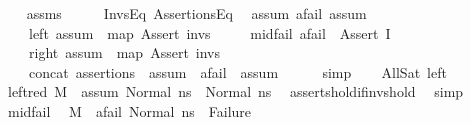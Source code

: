 \begin{isabellebody}
%
\isadelimproof
\ \ %
\endisadelimproof
%
\isatagproof
{}\isamarkupfalse%
\ assms\isanewline
{}\isamarkupfalse%
\ {\isacharminus}{\kern0pt}\isanewline
\ \ \isamarkupfalse%
\ InvsEq\ AssertionsEq\ \isamarkupfalse%
\ assum{}\ a{\isacharunderscore}{\kern0pt}fail\ assum{}\ \isanewline
\ \ \ \ left{\isacharcolon}{\kern0pt}\ {\isachardoublequoteopen}assum{}\ {\isacharequal}{\kern0pt}\ map\ Assert\ invs{}{\isachardoublequoteclose}\ \isanewline
\ \ \ \ mid{\isacharunderscore}{\kern0pt}fail{\isacharcolon}{\kern0pt}\ {\isachardoublequoteopen}a{\isacharunderscore}{\kern0pt}fail\ {\isacharequal}{\kern0pt}\ Assert\ I{\isachardoublequoteclose}\ \isanewline
\ \ \ \ right{\isacharcolon}{\kern0pt}\ {\isachardoublequoteopen}assum{}\ {\isacharequal}{\kern0pt}\ map\ Assert\ invs{}{\isachardoublequoteclose}\ \isanewline
\ \ \ \ concat{\isacharcolon}{\kern0pt}\ {\isachardoublequoteopen}assertions\ {\isacharequal}{\kern0pt}\ assum{}\ {\isacharat}{\kern0pt}\ {\isacharbrackleft}{\kern0pt}a{\isacharunderscore}{\kern0pt}fail{\isacharbrackright}{\kern0pt}\ {\isacharat}{\kern0pt}\ assum{}{\isachardoublequoteclose}\isanewline
\ \ \ \ \isamarkupfalse%
\ simp\isanewline
\ \ \isamarkupfalse%
\ AllSat\ left\ \isamarkupfalse%
\ left{\isacharunderscore}{\kern0pt}red{\isacharcolon}{\kern0pt}\ {\isachardoublequoteopen}M{\isacharcomma}{\kern0pt}{\isasymLambda}{\isacharcomma}{\kern0pt}{\isasymGamma}{\isacharcomma}{\kern0pt}{\isasymOmega}\ {\isasymturnstile}\ {\isasymlangle}assum{}{\isacharcomma}{\kern0pt}\ Normal\ ns{}{\isasymrangle}\ {\isacharbrackleft}{\kern0pt}{\isasymrightarrow}{\isacharbrackright}{\kern0pt}\ Normal\ ns{}{\isachardoublequoteclose}\ \isamarkupfalse%
\ asserts{\isacharunderscore}{\kern0pt}hold{\isacharunderscore}{\kern0pt}if{\isacharunderscore}{\kern0pt}invs{\isacharunderscore}{\kern0pt}hold\ \isamarkupfalse%
\ simp\isanewline
\ \ \isamarkupfalse%
\ mid{\isacharunderscore}{\kern0pt}fail\ \isamarkupfalse%
\ {\isachardoublequoteopen}M{\isacharcomma}{\kern0pt}{\isasymLambda}{\isacharcomma}{\kern0pt}{\isasymGamma}{\isacharcomma}{\kern0pt}{\isasymOmega}\ {\isasymturnstile}\ {\isasymlangle}a{\isacharunderscore}{\kern0pt}fail{\isacharcomma}{\kern0pt}\ Normal\ ns{}{\isasymrangle}\ {\isasymrightarrow}\ Failure{\isachardoublequoteclose}\ \isamarkupfalse%

\end{isabellebody}
